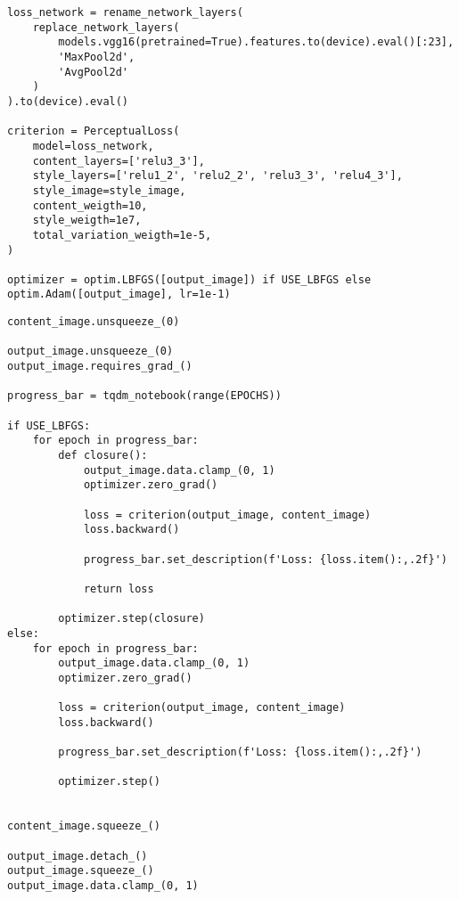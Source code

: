 \begin{listing}[H]
\begin{verbatim}
loss_network = rename_network_layers(
    replace_network_layers(
        models.vgg16(pretrained=True).features.to(device).eval()[:23],
        'MaxPool2d',
        'AvgPool2d'
    )
).to(device).eval()

criterion = PerceptualLoss(
    model=loss_network,
    content_layers=['relu3_3'],
    style_layers=['relu1_2', 'relu2_2', 'relu3_3', 'relu4_3'],
    style_image=style_image,    
    content_weigth=10,
    style_weigth=1e7,
    total_variation_weigth=1e-5,
)

optimizer = optim.LBFGS([output_image]) if USE_LBFGS else optim.Adam([output_image], lr=1e-1)
\end{verbatim}
\label{lst:neural_style_transfer_4}
\end{listing}

\pagebreak

\begin{listing}[H]
\begin{verbatim}
content_image.unsqueeze_(0)

output_image.unsqueeze_(0)
output_image.requires_grad_()

progress_bar = tqdm_notebook(range(EPOCHS))

if USE_LBFGS:
    for epoch in progress_bar:
        def closure():
            output_image.data.clamp_(0, 1)
            optimizer.zero_grad()

            loss = criterion(output_image, content_image)
            loss.backward()

            progress_bar.set_description(f'Loss: {loss.item():,.2f}')

            return loss

        optimizer.step(closure)
else:
    for epoch in progress_bar:
        output_image.data.clamp_(0, 1)
        optimizer.zero_grad()

        loss = criterion(output_image, content_image)
        loss.backward()

        progress_bar.set_description(f'Loss: {loss.item():,.2f}')

        optimizer.step()


content_image.squeeze_()

output_image.detach_()
output_image.squeeze_()
output_image.data.clamp_(0, 1)
\end{verbatim}
\label{lst:neural_style_transfer_5}
\end{listing}

